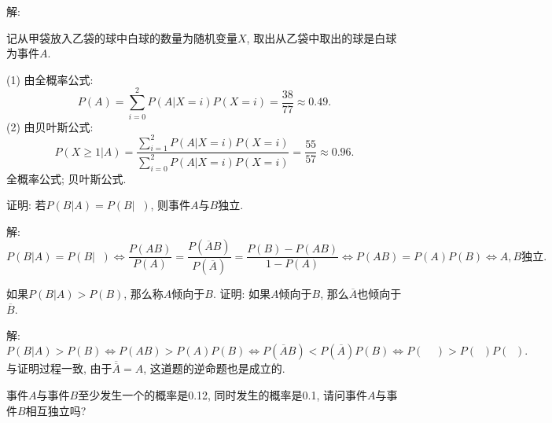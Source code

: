 \documentclass[standard]{ExBook}
\renewenvironment{shaded}{%
  \def\FrameCommand{\fboxsep=\FrameSep \colorbox{shadecolor}}%
  \MakeFramed{\advance\hsize-\width \FrameRestore}%
}{%
  \endMakeFramed
}
\begin{document}
\begin{qitems}
\vspace{\dimexpr2.5cm-5em\relax}

解:

记从甲袋放入乙袋的球中白球的数量为随机变量$X$, 取出从乙袋中取出的球是白球为事件$A$.

(1) 由全概率公式:
$$P(A)=\sum\limits_{i=0}^{2}P(A|X=i)P(X=i)=\frac{38}{77}\approx0.49.$$
(2) 由贝叶斯公式:
$$P(X\geq1|A)=\frac{\sum\limits_{i=1}^{2}P(A|X=i)P(X=i)}{\sum\limits_{i=0}^{2}P(A|X=i)P(X=i)}=\frac{55}{57}\approx0.96.$$
\textcolor{themeColor}{\selectfont {} 全概率公式; 贝叶斯公式.}

\vspace{2.5cm-5em}

    \begin{bbox}
    \begin{shaded}
        \qitem
证明: 若$P(B|A) = P(B|\mathop{\overline{A}})$, 则事件$A$与$B$独立.
    \end{shaded}
    \end{bbox}

\vspace{\dimexpr2.5cm-5em\relax}

解:
$$P(B|A) = P(B|\mathop{\overline{A}}) \Longleftrightarrow \frac{P(AB)}{P(A)}=\frac{P(\overline{A}B)}{P(\overline{A})}=\frac{P(B)-P(AB)}{1-P(A)} \Longleftrightarrow P(AB)=P(A)P(B) \Longleftrightarrow A,B\text{独立}.$$

\vspace{2.5cm-5em}

    \begin{bbox}
    \begin{shaded}
        \qitem
如果$P(B|A) > P(B)$, 那么称$A$倾向于$B$. 证明: 如果$A$倾向于$B$, 那么$\overline{A}$也倾向于$\overline{B}$.
    \end{shaded}
    \end{bbox}

\vspace{\dimexpr2.5cm-5em\relax}

解: 
$$P(B|A) > P(B) \Longleftrightarrow P(AB) > P(A)P(B) \Longleftrightarrow P(\overline{A}B) < P(\overline{A})P(B) \Longleftrightarrow P(\mathop{\overline{A}}\mathop{\overline{B}}) > P(\mathop{\overline{A}})P(\mathop{\overline{B}}).$$
\textcolor{themeColor}{\selectfont {} 与证明过程一致, 由于$\overline{\overline{A}}=A$, 这道题的逆命题也是成立的.}

\vspace{2.5cm-5em}

    \begin{bbox}
    \begin{shaded}
        \qitem
事件$A$与事件$B$至少发生一个的概率是0.12, 同时发生的概率是0.1, 请问事件$A$与事件$B$相互独立吗?
    \end{shaded}
    \end{bbox}


\end{qitems}
\end{document}
